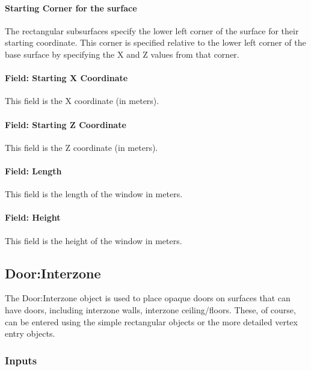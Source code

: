 \paragraph{Starting Corner for the surface}\label{starting-corner-for-the-surface-13}

The rectangular subsurfaces specify the lower left corner of the surface for their starting coordinate. This corner is specified relative to the lower left corner of the base surface by specifying the X and Z values from that corner.

\paragraph{Field: Starting X Coordinate}\label{field-starting-x-coordinate-13}

This field is the X coordinate (in meters).

\paragraph{Field: Starting Z Coordinate}\label{field-starting-z-coordinate-13}

This field is the Z coordinate (in meters).

\paragraph{Field: Length}\label{field-length-13}

This field is the length of the window in meters.

\paragraph{Field: Height}\label{field-height-7}

This field is the height of the window in meters.

\subsection{Door:Interzone}\label{doorinterzone}

The Door:Interzone object is used to place opaque doors on surfaces that can have doors, including interzone walls, interzone ceiling/floors. These, of course, can be entered using the simple rectangular objects or the more detailed vertex entry objects.

\subsubsection{Inputs}\label{inputs-18-010}

